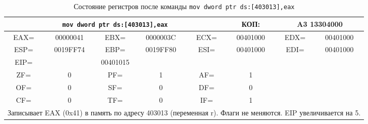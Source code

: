 \begin{table}[H]
    \centering
    \caption{Состояние регистров после команды \texttt{mov dword ptr ds:[403013],eax}}
    \label{tab:after_mov_r}
    \small
    \renewcommand{\arraystretch}{1.3}
    \begin{tabular}{|c|c|c|c|c|c|c|c|}
    \hline
    \multicolumn{5}{|c|}{\cellcolor{green!40}\textbf{\texttt{mov dword ptr ds:[403013],eax}}} & \cellcolor{green!20} КОП: & \multicolumn{2}{c|}{\cellcolor{green!20} A3 13304000} \\
    \hline
    \cellcolor{blue!30} EAX= & 00000041 & \cellcolor{blue!30} EBX= & 0000003C & \cellcolor{blue!30} ECX= & 00401000 & \cellcolor{blue!30} EDX= & 00401000 \\
    \hline
    \cellcolor{blue!30} ESP= & 0019FF74 & \cellcolor{blue!30} EBP= & 0019FF80 & \cellcolor{blue!30} ESI= & 00401000 & \cellcolor{blue!30} EDI= & 00401000 \\
    \hline
    \cellcolor{blue!30} EIP= & \multicolumn{3}{c|}{\cellcolor{red!70} 00401015} & \multicolumn{4}{c|}{} \\
    \hline
    \cellcolor{pink} ZF= & 0 & \cellcolor{pink} PF= & 1 & \cellcolor{pink} AF= & 1 & \multicolumn{2}{c|}{\cellcolor{gray!50}} \\
    \cline{1-6}
    \cellcolor{pink} OF= & 0 & \cellcolor{pink} SF= & 0 & \cellcolor{pink} DF= & 0 & \multicolumn{2}{c|}{\cellcolor{gray!50}} \\
    \cline{1-6}
    \cellcolor{pink} CF= & 0 & \cellcolor{pink} TF= & 0 & \cellcolor{pink} IF= & 1 & \multicolumn{2}{c|}{\cellcolor{gray!50}} \\
    \hline
    \multicolumn{8}{|p{14cm}|}{Записывает EAX (0x41) в память по адресу 403013 (переменная r). Флаги не меняются. EIP увеличивается на 5.} \\
    \hline
    \end{tabular}
\end{table}

